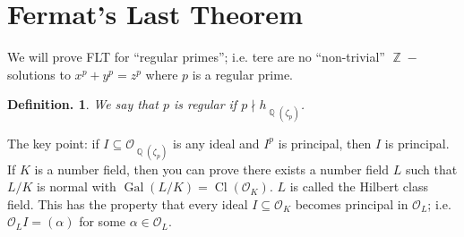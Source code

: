 \documentclass[11pt, a4paper]{memoir}
\DeclareMathOperator{\Q}{{\mathbb{Q}}}
\DeclareMathOperator{\Z}{{\mathbb{Z}}}
\theoremstyle{change}
\theoremstyle{plain}
\theoremstyle{nonumberplain}
\newtheorem{definition}{Definition.}
\DeclareMathOperator{\Gal}{Gal}
\DeclareMathOperator{\Cl}{Cl}
\begin{document}
\section{Fermat's Last Theorem}
We will prove FLT for ``regular primes''; i.e. tere are no ``non-trivial'' $\Z-$solutions to $x^p+y^p=z^p$ where $p$ is a regular prime.
\begin{definition}
    We say that $p$ is regular if $p\nmid h_{\Q(\zeta_p)}$.
\end{definition}
The key point: if $I\subseteq\mathcal{O}_{\Q(\zeta_p)}$ is any ideal and $I^p$ is principal, then $I$ is principal.
If $K$ is a number field, then you can prove there exists a number field $L$ such that $L/K$ is normal with $\Gal(L/K)=\Cl(\mathcal{O}_K)$.
$L$ is called the Hilbert class field.
This has the property that every ideal $I\subseteq\mathcal{O}_K$ becomes principal in $\mathcal{O}_L$; i.e. $\mathcal{O}_LI=(\alpha)$ for some $\alpha\in\mathcal{O}_L$.
\end{document}

